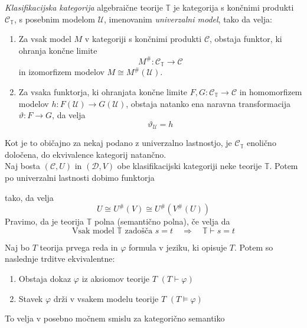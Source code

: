 \documentclass[../kategoricna_logika.tex]{subfiles}
\begin{document}
\begin{definicija}
\emph{Klasifikacijska kategorija} algebraične teorije $\mathbb{T}$ je kategorija s končnimi produkti $\mathcal{C}_\mathbb{T}$, s posebnim modelom $\mathcal{U}$, imenovanim \emph{univerzalni model}, tako da velja:
\begin{enumerate}
\item Za vsak model $M$ v kategoriji s končnimi produkti $\mathcal{C}$, obstaja funktor, ki ohranja končne limite $$M^{\#} : \mathcal{C}_\mathbb{T} \to \mathcal{C}$$
in izomorfizem modelov $M \cong M^{\#}(\mathcal{U})$.
%
\item Za vsaka funktorja, ki ohranjata končne limite $F,G : \mathcal{C}_\mathbb{T} \to \mathcal{C}$ in homomorfizem modelov $h: F(\mathcal{U}) \to G(\mathcal{U})$, obstaja natanko ena naravna transformacija $\vartheta : F \to G$, da velja
$$\vartheta_\mathcal{U} = h$$
\end{enumerate}
\end{definicija}
Kot je to običajno za nekaj podano z univerzalno lastnostjo, je $\mathcal{C}_\mathbb{T}$ enolično določena, do ekvivalence kategorij natančno. \\
\vspace{1cm}
%
Naj bosta $(\mathcal{C}, U)$ in $(\mathcal{D}, V)$ obe klasifikacijski kategoriji neke teorije $\mathbb{T}$. Potem po univerzalni lastnosti dobimo funktorja
\begin{center}
\end{center}
tako, da velja
$$U \cong U^{\#}(V) \cong U^{\#}(V^{\#}(U))$$
Pravimo, da je teorija $\mathbb{T}$ polna (semantično polna), če velja da
$$\text{Vsak model } \mathbb{T} \text{ zadošča }s=t \quad \Longrightarrow \quad \mathbb{T} \vdash s = t$$
\begin{izrek}[Gödel]
Naj bo $T$ teorija prvega reda in $\varphi$ formula v jeziku, ki opisuje $T$. Potem so naslednje trditve ekvivalentne:
\begin{enumerate}
\item Obstaja dokaz $\varphi$ iz aksiomov teorije $T$ $(T \vdash \varphi)$
\item Stavek $\varphi$ drži v vsakem modelu teorije $T$ $(T \models \varphi)$
\end{enumerate}
\end{izrek}
To velja v posebno močnem smislu za kategorično semantiko
\end{document}

